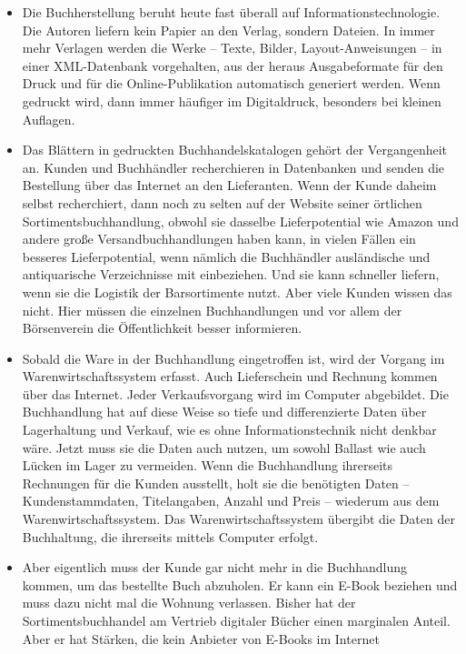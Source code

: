 \documentclass[a4paper,
fontsize=11pt,
oneside,
numbers=noperiodatend,
parskip=half-,
bibliography=totoc,
final
]{scrartcl}
\begin{document}
\begin{itemize}
\item
  Die Buchherstellung beruht heute fast überall auf
  Informationstechnologie. Die Autoren liefern kein Papier an den
  Verlag, sondern Dateien. In immer mehr Verlagen werden die Werke --
  Texte, Bilder, Layout-Anweisungen -- in einer XML-Datenbank
  vorgehalten, aus der heraus Ausgabeformate für den Druck und für die
  Online-Publikation automatisch generiert werden. Wenn gedruckt wird,
  dann immer häufiger im Digitaldruck, besonders bei kleinen Auflagen.
\item
  Das Blättern in gedruckten Buchhandelskatalogen gehört der
  Vergangenheit an. Kunden und Buchhändler recherchieren in Datenbanken
  und senden die Bestellung über das Internet an den Lieferanten. Wenn
  der Kunde daheim selbst recherchiert, dann noch zu selten auf der
  Website seiner örtlichen Sortimentsbuchhandlung, obwohl sie dasselbe
  Lieferpotential wie Amazon und andere große Versandbuchhandlungen
  haben kann, in vielen Fällen ein besseres Lieferpotential, wenn
  nämlich die Buchhändler ausländische und antiquarische Verzeichnisse
  mit einbeziehen. Und sie kann schneller liefern, wenn sie die Logistik
  der Barsortimente nutzt. Aber viele Kunden wissen das nicht. Hier
  müssen die einzelnen Buchhandlungen und vor allem der Börsenverein die
  Öffentlichkeit besser informieren.
\item
  Sobald die Ware in der Buchhandlung eingetroffen ist, wird der Vorgang
  im Warenwirtschaftssystem erfasst. Auch Lieferschein und Rechnung
  kommen über das Internet. Jeder Verkaufsvorgang wird im Computer
  abgebildet. Die Buchhandlung hat auf diese Weise so tiefe und
  differenzierte Daten über Lagerhaltung und Verkauf, wie es ohne
  Informationstechnik nicht denkbar wäre. Jetzt muss sie die Daten auch
  nutzen, um sowohl Ballast wie auch Lücken im Lager zu vermeiden. Wenn
  die Buchhandlung ihrerseits Rechnungen für die Kunden ausstellt, holt
  sie die benötigten Daten -- Kundenstammdaten, Titelangaben, Anzahl und
  Preis -- wiederum aus dem Warenwirtschaftssystem. Das
  Warenwirtschaftssystem übergibt die Daten der Buchhaltung, die
  ihrerseits mittels Computer erfolgt.
\item
  Aber eigentlich muss der Kunde gar nicht mehr in die Buchhandlung
  kommen, um das bestellte Buch abzuholen. Er kann ein E-Book beziehen
  und muss dazu nicht mal die Wohnung verlassen. Bisher hat der
  Sortimentsbuchhandel am Vertrieb digitaler Bücher einen marginalen
  Anteil. Aber er hat Stärken, die kein Anbieter von E-Books im Internet

\end{itemize}
\end{document}

